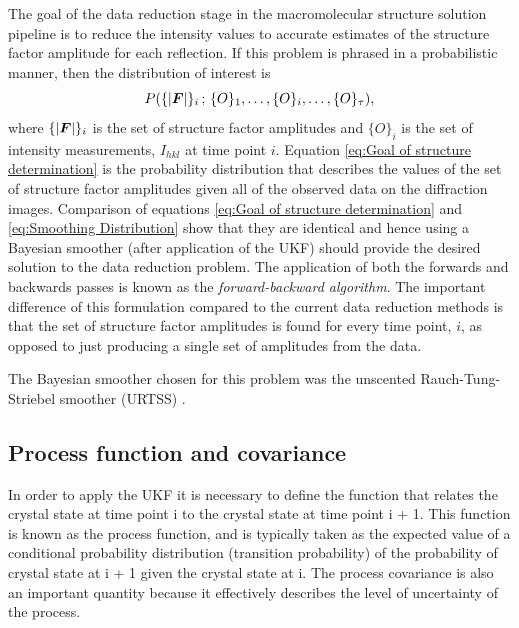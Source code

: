 The goal of the data reduction stage in the macromolecular structure solution pipeline is to reduce the intensity values to accurate estimates of the structure factor amplitude for each reflection.
If this problem is phrased in a probabilistic manner, then the distribution of interest is
\begin{equation}
    P(\{|\boldsymbol{F}|\}_i \,;\, \{O\}_1, \ldots, \{O\}_i,\ldots, \{O\}_{\tau}),
    \label{eq:Goal of structure determination}
\end{equation}
where $\{|\boldsymbol{F}|\}_i$ is the set of structure factor amplitudes and $\{O\}_i$ is the set of intensity measurements, $I_{hkl}$ at time point $i$.
Equation \ref{eq:Goal of structure determination} is the probability distribution that describes the values of the set of structure factor amplitudes given all of the observed data on the diffraction images.
Comparison of equations \ref{eq:Goal of structure determination} and \ref{eq:Smoothing Distribution} show that they are identical and hence using a Bayesian smoother (after application of the UKF) should provide the desired solution to the data reduction problem.
The application of both the forwards and backwards passes is known as the \textit{forward-backward algorithm}.
The important difference of this formulation compared to the current data reduction methods is that the set of structure factor amplitudes is found for every time point, $i$, as opposed to just producing a single set of amplitudes from the data.

The Bayesian smoother chosen for this problem was the unscented Rauch-Tung-Striebel smoother (URTSS) \cite{sarkka2008unscented}.

\subsection{Process function and covariance}
\label{sub:Process Function and covariance}
In order to apply the UKF it is necessary to define the function that relates the crystal state at time point i to the crystal state at time point i + 1.
This function is known as the process function, and is typically taken as the expected value of a conditional probability distribution (transition probability) of the probability of crystal state at i + 1 given the crystal state at i.
The process covariance is also an important quantity because it effectively describes the level of uncertainty of the process.

